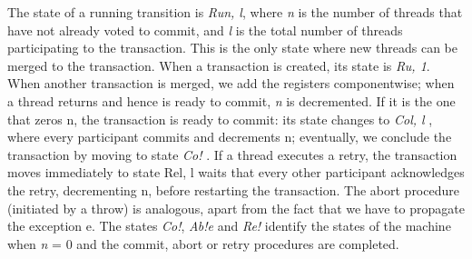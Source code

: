 The state of a running transition is \emph{Ru\textlangle n, l\textrangle}, where \emph{n} is the number of threads that have not already voted to commit, and \emph{l} is the total number of threads participating to the transaction.
This is the only state where new threads can be merged to the transaction. When a transaction is created, its state is \emph{Ru, 1\textrangle}.
When another transaction is merged, we add the registers componentwise; when a thread returns and hence is ready to commit, \emph{n} is decremented.
If it is the one that zeros n, the transaction is ready to commit: its state changes to \emph{Co\textlangle l, l\textrangle} , where every participant commits and decrements n; eventually, we conclude the transaction by moving to state \emph{Co!\textlangle \textrangle} .
If a thread executes a retry, the transaction moves immediately to state Re\textlangle l, l\textrangle\xspace waits that every other participant acknowledges the retry, decrementing n, before restarting the transaction.
The abort procedure (initiated by a throw) is analogous, apart from the fact that we have to propagate the exception e.
The states \emph{Co!\textlangle \textrangle }, \emph{Ab!\textlangle e\textrangle}  and \emph{Re!\textlangle \textrangle}  identify the states of the machine when \emph{n} = 0 and the commit, abort or retry procedures are completed.

